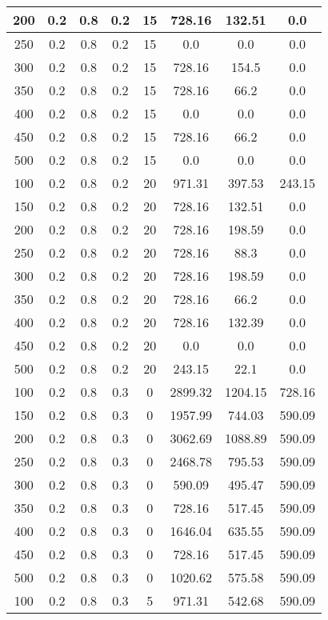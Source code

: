 \documentclass[a4paper, 12pt]{extreport}
\begin{document}
\begin{itemize}
\begin{longtable}{|c|c|c|c|c|c|c|c|}
			200 & 0.2 & 0.8 & 0.2 & 15 & 728.16 & 132.51 & 0.0 \\\hline
			250 & 0.2 & 0.8 & 0.2 & 15 & 0.0 & 0.0 & 0.0 \\\hline
			300 & 0.2 & 0.8 & 0.2 & 15 & 728.16 & 154.5 & 0.0 \\\hline
			350 & 0.2 & 0.8 & 0.2 & 15 & 728.16 & 66.2 & 0.0 \\\hline
			400 & 0.2 & 0.8 & 0.2 & 15 & 0.0 & 0.0 & 0.0 \\\hline
			450 & 0.2 & 0.8 & 0.2 & 15 & 728.16 & 66.2 & 0.0 \\\hline
			500 & 0.2 & 0.8 & 0.2 & 15 & 0.0 & 0.0 & 0.0 \\\hline
			100 & 0.2 & 0.8 & 0.2 & 20 & 971.31 & 397.53 & 243.15 \\\hline
			150 & 0.2 & 0.8 & 0.2 & 20 & 728.16 & 132.51 & 0.0 \\\hline
			200 & 0.2 & 0.8 & 0.2 & 20 & 728.16 & 198.59 & 0.0 \\\hline
			250 & 0.2 & 0.8 & 0.2 & 20 & 728.16 & 88.3 & 0.0 \\\hline
			300 & 0.2 & 0.8 & 0.2 & 20 & 728.16 & 198.59 & 0.0 \\\hline
			350 & 0.2 & 0.8 & 0.2 & 20 & 728.16 & 66.2 & 0.0 \\\hline
			400 & 0.2 & 0.8 & 0.2 & 20 & 728.16 & 132.39 & 0.0 \\\hline
			450 & 0.2 & 0.8 & 0.2 & 20 & 0.0 & 0.0 & 0.0 \\\hline
			500 & 0.2 & 0.8 & 0.2 & 20 & 243.15 & 22.1 & 0.0 \\\hline
			100 & 0.2 & 0.8 & 0.3 & 0 & 2899.32 & 1204.15 & 728.16 \\\hline
			150 & 0.2 & 0.8 & 0.3 & 0 & 1957.99 & 744.03 & 590.09 \\\hline
			200 & 0.2 & 0.8 & 0.3 & 0 & 3062.69 & 1088.89 & 590.09 \\\hline
			250 & 0.2 & 0.8 & 0.3 & 0 & 2468.78 & 795.53 & 590.09 \\\hline
			300 & 0.2 & 0.8 & 0.3 & 0 & 590.09 & 495.47 & 590.09 \\\hline
			350 & 0.2 & 0.8 & 0.3 & 0 & 728.16 & 517.45 & 590.09 \\\hline
			400 & 0.2 & 0.8 & 0.3 & 0 & 1646.04 & 635.55 & 590.09 \\\hline
			450 & 0.2 & 0.8 & 0.3 & 0 & 728.16 & 517.45 & 590.09 \\\hline
			500 & 0.2 & 0.8 & 0.3 & 0 & 1020.62 & 575.58 & 590.09 \\\hline
			100 & 0.2 & 0.8 & 0.3 & 5 & 971.31 & 542.68 & 590.09 \\\hline

\end{longtable}
\end{itemize}
\end{document}

